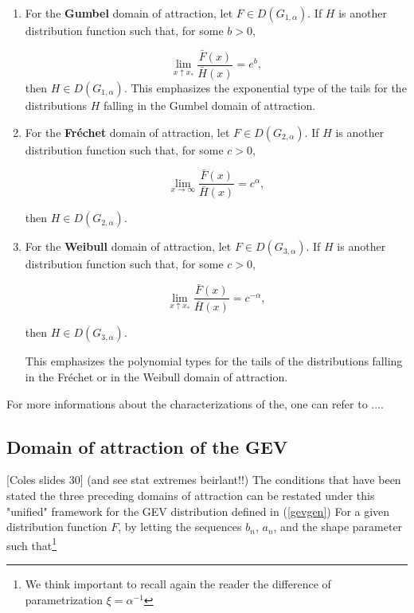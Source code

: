 \documentclass[11pt,a4paper,openany ]{book}
\begin{document}
\begin{enumerate}
	\item For the \textbf{Gumbel} domain of attraction,  let $F\in D(G_{1,\alpha})$. If $H$ is another distribution function such that, for some $b>0$, 
	
	\begin{equation}
	\displaystyle{\lim_{ x \uparrow x_*}} \frac{\bar{F}(x)}{\bar{H}(x)}=e^{b},
	\end{equation}
	then $H\in D(G_{1,\alpha})$. This emphasizes the exponential type of the  tails for the distributions $H$ falling in the Gumbel domain of attraction.
	
	
	\item For the \textbf{Fréchet} domain of attraction, let $F\in D(G_{2,\alpha})$. If $H$ is another distribution function such that, for some $c>0$, 
	
	\begin{equation}
	\displaystyle{\lim_{ x \to\infty}} \frac{\bar{F}(x)}{\bar{H}(x)}=c^{\alpha},
	\end{equation}
	
	then $H\in D(G_{2,\alpha})$.
	
	\item For the \textbf{Weibull} domain of attraction,  let $F\in D(G_{3,\alpha})$. If $H$ is another distribution function such that, for some $c>0$, 
	
	\begin{equation}
	\displaystyle{\lim_{ x  \uparrow  x_*}} \frac{\bar{F}(x)}{\bar{H}(x)}=c^{-\alpha},
	\end{equation}
	
	then $H\in D(G_{3,\alpha})$.
	
	This emphasizes the polynomial types for the tails of the distributions falling in the Fréchet or in the Weibull domain of attraction.
\end{enumerate}


For more informations about the characterizations of the, one can refer to ....

\subsection{Domain of attraction of the GEV}
[Coles slides 30] (and see stat extremes beirlant!!) The conditions that have been stated the three preceding domains of attraction can be restated under this "unified" framework for the GEV distribution defined in (\ref{gevgen})
For a given distribution function $F$, by letting the sequences $b_n$, $a_n$, and the shape parameter such that\footnote{We think important to recall again the reader the difference of parametrization $\xi=\alpha^{-1}$}
\end{document}
